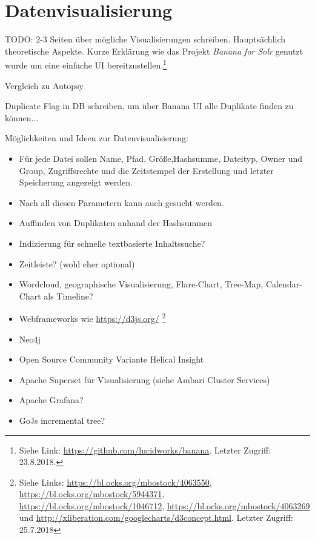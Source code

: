 \chapter{Datenvisualisierung}
\label{ch:data_visualization}
TODO: 2-3 Seiten über mögliche Visualisierungen schreiben. Hauptsächlich theoretische Aspekte. Kurze Erklärung wie das Projekt \textit{Banana for Solr} genutzt wurde um eine
einfache UI bereitzustellen.\footnote{Siehe Link: \url{https://github.com/lucidworks/banana}. Letzter Zugriff: 23.8.2018.}

\noindent
Vergleich zu Autopsy

Duplicate Flag in DB schreiben, um über Banana UI alle Duplikate finden zu können...

Möglichkeiten und Ideen zur Datenvisualisierung:
\begin{itemize}
\item Für jede Datei sollen Name, Pfad, Größe,Hashsumme, Dateityp, Owner und Group, Zugriffsrechte und die Zeitstempel der Erstellung und letzter Speicherung angezeigt werden. 
\item Nach all diesen Parametern kann auch gesucht werden.
\item Auffinden von Duplikaten anhand der Hashsummen
\item Indizierung für schnelle textbasierte Inhaltssuche?
\item Zeitleiste? (wohl eher optional)
\item Wordcloud, geographische Visualisierung, Flare-Chart, Tree-Map, Calendar-Chart als Timeline?
\item Webframeworks wie \url{https://d3js.org/} \footnote{Siehe Links: \url{https://bl.ocks.org/mbostock/4063550}, \url{https://bl.ocks.org/mbostock/5944371}, \url{https://bl.ocks.org/mbostock/1046712}, \url{https://bl.ocks.org/mbostock/4063269} und \url{http://xliberation.com/googlecharts/d3concept.html}. Letzter Zugriff: 25.7.2018}
\item Neo4j
\item Open Source Community Variante Helical Insight
\item Apache Superset für Visualisierung (siehe Ambari Cluster Services)
\item Apache Grafana?
\item GoJs incremental tree?
\end{itemize}
